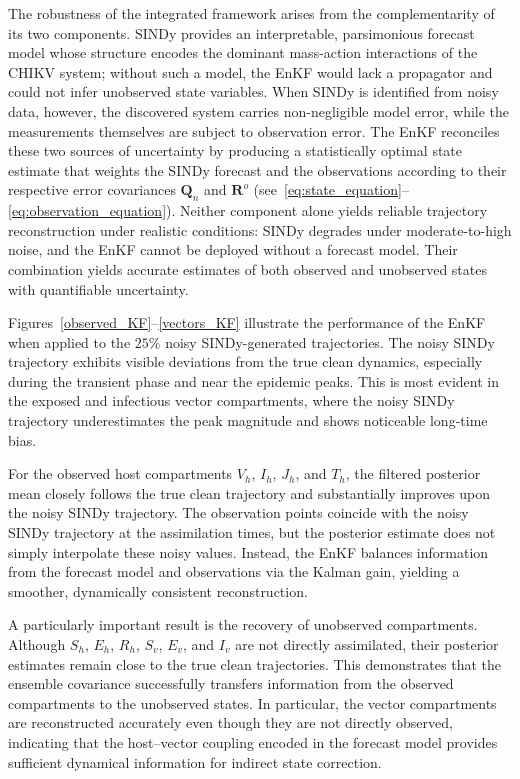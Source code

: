 \documentclass[9pt]{article}
\numberwithin{equation}{section}
\begin{document}
The robustness of the integrated framework arises from the complementarity of its two components. SINDy provides an interpretable, parsimonious forecast model whose structure encodes the dominant mass-action interactions of the CHIKV system; without such a model, the EnKF would lack a propagator and could not infer unobserved state variables. When SINDy is identified from noisy data, however, the discovered system carries non-negligible model error, while the measurements themselves are subject to observation error. The EnKF reconciles these two sources of uncertainty by producing a statistically optimal state estimate that weights the SINDy forecast and the observations according to their respective error covariances $\mathbf{Q}_n$ and $\mathbf{R}^o$ (see~\eqref{eq:state_equation}--\eqref{eq:observation_equation}). Neither component alone yields reliable trajectory reconstruction under realistic conditions: SINDy degrades under moderate-to-high noise, and the EnKF cannot be deployed without a forecast model. Their combination yields accurate estimates of both observed and unobserved states with quantifiable uncertainty.

Figures~\ref{observed_KF}--\ref{vectors_KF} illustrate the performance of the EnKF when applied to the $25\%$ noisy SINDy-generated trajectories. The noisy SINDy trajectory exhibits visible deviations from the true clean dynamics, especially during the transient phase and near the epidemic peaks. This is most evident in the exposed and infectious vector compartments, where the noisy SINDy trajectory underestimates the peak magnitude and shows noticeable long-time bias.

For the observed host compartments $V_h$, $I_h$, $J_h$, and $T_h$, the filtered posterior mean closely follows the true clean trajectory and substantially improves upon the noisy SINDy trajectory. The observation points coincide with the noisy SINDy trajectory at the assimilation times, but the posterior estimate does not simply interpolate these noisy values. Instead, the EnKF balances information from the forecast model and observations via the Kalman gain, yielding a smoother, dynamically consistent reconstruction.

A particularly important result is the recovery of unobserved compartments. Although $S_h$, $E_h$, $R_h$, $S_v$, $E_v$, and $I_v$ are not directly assimilated, their posterior estimates remain close to the true clean trajectories. This demonstrates that the ensemble covariance successfully transfers information from the observed compartments to the unobserved states. In particular, the vector compartments are reconstructed accurately even though they are not directly observed, indicating that the host--vector coupling encoded in the forecast model provides sufficient dynamical information for indirect state correction.
\end{document}
